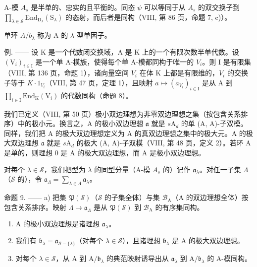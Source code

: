 A-模 \(A_{s}\) 是半单的、忠实的且平衡的。同态 \(\psi\) 可以等同于从 \(A_{s}\) 的双交换子到 \(\prod_{\lambda\in\mathcal{S}}\mathrm{End}_{\mathrm{D}_{\lambda}}(\mathrm{S}_{\lambda})\) 的态射，而后者是同构（VIII, 第 86 页，命题 7, c)）。

单环 \(A/b_{\lambda}\) 称为 A 的 \(\lambda\) 型单因子。

例. —— 设 K 是一个代数闭交换域，A 是 K 上的一个有限次数半单代数。设 \((\mathrm{V}_{i})_{i\in\mathrm{I}}\) 是一个单 A-模族，使得每个单 A-模都同构于唯一的 \(V_{i}\)。则 I 是有限集（VIII, 第 136 页，命题 1），诸向量空间 \(V_{i}\) 在体 K 上都是有限维的，\(V_{i}\) 的交换子等于 \(K\cdot1_{V_{i}}\)（VIII, 第 47 页，定理 1），且映射 \(a\mapsto(a_{V_{i}})_{i\in\mathrm{I}}\) 是从 A 到 \(\prod_{i\in\mathrm{I}}\mathrm{End}_{\mathrm{K}}(\mathrm{V}_{i})\) 的代数同构（命题 8）。

我们已定义（VIII, 第 50 页）极小双边理想为非零双边理想之集（按包含关系排序）中的极小元。换言之，A 的极小双边理想 \(\mathfrak{a}\) 就是 \(s\mathrm{A}_d\) 的单 (A, A)-子双模。同样，我们把 A 的极大双边理想定义为 A 的真双边理想之集中的极大元。A 的极大双边理想 \(\mathfrak{a}\) 就是 \(s\mathrm{A}_d\) 的极大 (A, A)-子双模（VIII, 第 48 页，定义 2）。若环 A 是单的，则理想 0 是 A 的极大双边理想，而 A 是极小双边理想。

对每个 \(\lambda \in \mathcal{S}\)，我们把型为 \(\lambda\) 的同型分量（A-模 \(A_s\) 的）记作 \(\mathfrak{a}_{\lambda}\)。对任一子集 \(\Lambda\)（\(\mathcal{S}\) 的），令 \(\mathfrak{a}_{\Lambda} = \sum_{\lambda \in \Lambda} \mathfrak{a}_{\lambda}\)。

命题 9. —— a) 把集 \(\mathfrak{P}(\mathcal{S})\)（\(\mathcal{S}\) 的子集全体）与集 \(\mathcal{B}_{\mathrm{A}}\)（A 的双边理想全体）按包含关系排序。映射 \(\Lambda \mapsto \mathfrak{a}_{\Lambda}\) 是从 \(\mathfrak{P}(\mathcal{S})\) 到 \(\mathcal{B}_{\mathrm{A}}\) 的有序集同构。

\begin{enumerate}
\def\labelenumi{\alph{enumi})}
\setcounter{enumi}{1}
\item
  A 的极小双边理想是诸理想 \(\mathfrak{a}_{\lambda}\)。
\item
  我们有 \(\mathfrak{b}_{\lambda} = \mathfrak{a}_{\mathcal{S} - \{\lambda\}}\)（对每个 \(\lambda \in \mathcal{S}\)），且诸理想 \(\mathfrak{b}_{\lambda}\) 是 A 的极大双边理想。
\item
  对每个 \(\lambda \in \mathcal{S}\)，从 A 到 \(\mathrm{A} / \mathfrak{b}_{\lambda}\) 的典范映射诱导出从 \(\mathfrak{a}_{\lambda}\) 到 \(\mathrm{A} / \mathfrak{b}_{\lambda}\) 的 A-模同构。
\end{enumerate}

